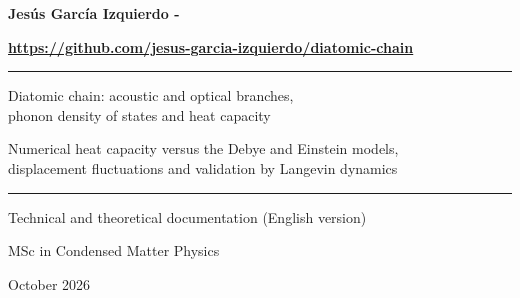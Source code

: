 \documentclass[11pt,a4paper]{article}
\begin{document}
\begin{titlepage}
\centering
\vspace*{2.2cm}
{\LARGE\bfseries Jesús García Izquierdo -\par}
\vspace{6pt}
{\Large\bfseries\mbox{\href{https://github.com/jesus-garcia-izquierdo/diatomic-chain}{https://github.com/jesus-garcia-izquierdo/diatomic-chain}}\par}
\vspace{1.6cm}
\rule{0.75\textwidth}{0.6pt}\par\vspace{0.5cm}
{\Large Diatomic chain: acoustic and optical branches,\\[2pt]
phonon density of states and heat capacity\par}
\vspace{0.3cm}
{\large Numerical heat capacity versus the Debye and Einstein models,\\
displacement fluctuations and validation by Langevin dynamics\par}
\vspace{0.5cm}
\rule{0.75\textwidth}{0.6pt}\par
\vspace{1.4cm}
{\large Technical and theoretical documentation (English version)\par}
\vspace{0.3cm}
{\normalsize MSc in Condensed Matter Physics\par}
\vfill
{\normalsize October 2026\par}
\end{titlepage}
\end{document}
